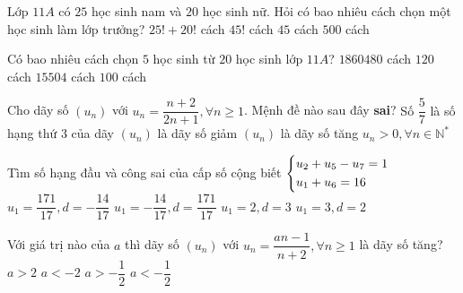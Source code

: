 \begin{ex}%
	Lớp $11A$ có $25$ học sinh nam và $20$ học sinh nữ. Hỏi có bao nhiêu cách chọn một học sinh làm lớp trưởng?
	\choice
	{$25!+20!$ cách}
	{$45!$ cách}
	{\True $45$ cách}
	{$500$ cách}
\end{ex}

\begin{ex}%
	Có bao nhiêu cách chọn $ 5 $ học sinh từ $ 20 $ học sinh lớp $ 11A $?
	\choice
	{$1860480$ cách}
	{$120$ cách}
	{\True $15504$ cách}
	{$100$ cách}
\end{ex}

\begin{ex}%
	Cho dãy số $(u_n)$ với $u_n=\dfrac{n+2}{2n+1},\forall n\geq 1$. Mệnh đề nào sau đây \textbf{sai}?
		\choice
		{ Số $\dfrac{5}{7}$ là số hạng thứ $ 3 $ của dãy}
		{ $(u_n)$ là dãy số giảm}
		{\True $(u_n)$ là dãy số tăng} 
		{ $u_n>0,\forall n\in\mathbb{N}^{*} $}
	\end{ex}

\begin{ex}%
	Tìm số hạng đầu và công sai của cấp số cộng biết  $\left\{\begin{aligned}& u_2+u_5-u_7=1 \\& u_1+u_6=16 \end{aligned}\right.$
	\choice
	{$u_1=\dfrac{171}{17},d=-\dfrac{14}{17}$}
	{$u_1=-\dfrac{14}{17},d=\dfrac{171}{17}$}
	{$u_1=2,d=3$}
	{\True $u_1=3,d=2$}
\end{ex}

\begin{ex}%
		Với giá trị nào của $a$ thì dãy số $(u_n)$ với $u_n=\dfrac{an-1}{n+2},\forall n\geq 1$ là dãy số tăng? 
		\choice
		{$a>2$}
		{$a<-2$}
		{\True $a>-\dfrac{1}{2}$}
		{$a<-\dfrac{1}{2}$}
	\end{ex}

